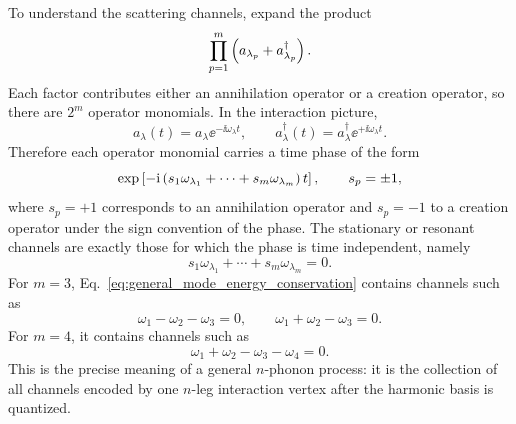 To understand the scattering channels, expand the product
\begin{equation}
    \prod_{p=1}^m \left( a_{\lambda_p}+a_{\lambda_p}^\dagger \right).
\end{equation}
Each factor contributes either an annihilation operator or a creation operator, so there are $2^m$ operator monomials. In the interaction picture,
\begin{equation}
    a_\lambda(t) = a_\lambda\ee^{-\ii\omega_\lambda t},
    \qquad
    a_\lambda^\dagger(t) = a_\lambda^\dagger\ee^{+\ii\omega_\lambda t}.
    \label{eq:a_time_evolution_modes}
\end{equation}
Therefore each operator monomial carries a time phase of the form
\begin{equation}
    \exp\left[ -\mathrm{i}\left( s_1\omega_{\lambda_1} + \cdots + s_m\omega_{\lambda_m} \right)t \right],
    \qquad s_p = \pm 1,
\end{equation}
where $s_p = +1$ corresponds to an annihilation operator and $s_p=-1$ to a creation operator under the sign convention of the phase. The stationary or resonant channels are exactly those for which the phase is time independent, namely
\begin{equation}
    s_1\omega_{\lambda_1} + \cdots + s_m\omega_{\lambda_m} = 0.
    \label{eq:general_mode_energy_conservation}
\end{equation}
For $m=3$, Eq.~\eqref{eq:general_mode_energy_conservation} contains channels such as
\begin{equation}
    \omega_1 - \omega_2 - \omega_3 = 0,
    \qquad
    \omega_1 + \omega_2 - \omega_3 = 0.
\end{equation}
For $m=4$, it contains channels such as
\begin{equation}
    \omega_1 + \omega_2 - \omega_3 - \omega_4 = 0.
\end{equation}
This is the precise meaning of a general $n$-phonon process: it is the collection of all channels encoded by one $n$-leg interaction vertex after the harmonic basis is quantized.

